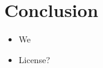 \documentclass[oribibl]{llncs2e/llncs}
\begin{document}

\section{Conclusion}
\begin{itemize}
\item We 
\item License?
\end{itemize}



\end{document}
